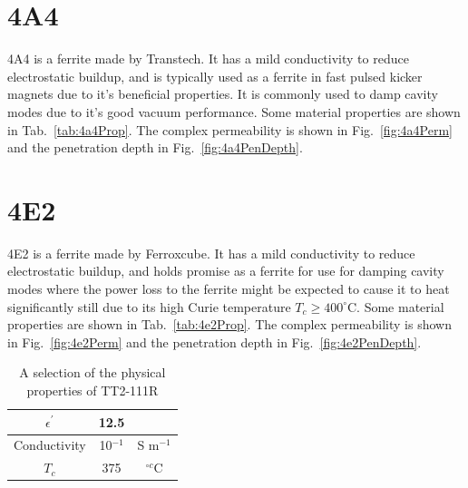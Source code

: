 \section{4A4}

4A4 is a ferrite made by Transtech. It has a mild conductivity to reduce electrostatic buildup, and is typically used as a ferrite in fast pulsed kicker magnets due to it's beneficial properties. It is commonly used to damp cavity modes due to it's good vacuum performance. Some material properties are shown in Tab.~\ref{tab:4a4Prop}. The complex permeability is shown in Fig.~\ref{fig:4a4Perm} and the penetration depth in Fig.~\ref{fig:4a4PenDepth}.

\section{4E2}

4E2 is a ferrite made by Ferroxcube. It has a mild conductivity to reduce electrostatic buildup, and holds promise as a ferrite for use for damping cavity modes where the power loss to the ferrite might be expected to cause it to heat significantly still due to its high Curie temperature $T_{c} \geq 400^{\circ}$C. Some material properties are shown in Tab.~\ref{tab:4e2Prop}. The complex permeability is shown in Fig.~\ref{fig:4e2Perm} and the penetration depth in Fig.~\ref{fig:4e2PenDepth}.

\begin{table}
\caption{A selection of the physical properties of TT2-111R}
\label{tab:tt2111rProp}
\begin{center}
\begin{tabular}{c | c | c}
$\epsilon^{'}$ & 12.5 & \\ \hline
Conductivity  & 10$^{-1}$ & S m$^{-1}$\\ \hline
$T_{c}$ & 375 & $^{\circ c}$C \\
\end{tabular}
\end{center}
\end{table}

